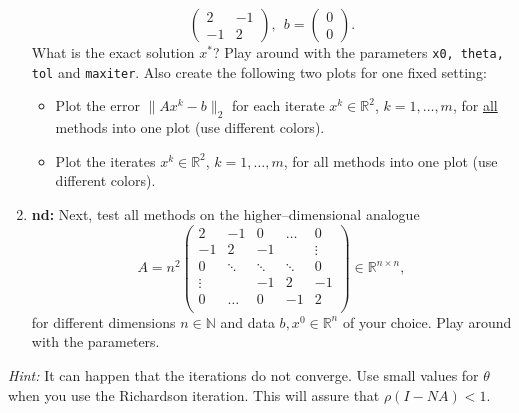 \begin{enumerate}
$$\begin{pmatrix}
		2&-1\\ -1&2
		\end{pmatrix}, ~~b = \begin{pmatrix}
		0\\0
		\end{pmatrix}.$$ 
		What is the exact solution $x^*$? Play around with the parameters \texttt{x0, theta, tol} and \texttt{maxiter}.
		Also create the following two plots for one fixed setting:
		\begin{itemize}
			\item Plot the error $\|Ax^k - b\|_2$  for each iterate $x^k \in \mathbb{R}^2$, $k=1,\dots,m$, for \underline{all} methods into one plot (use different colors).
			\item Plot the iterates $x^k \in \mathbb{R}^2$, $k=1,\dots,m$, for all methods into one plot (use different colors).
		\end{itemize}
		\item \textbf{nd:} Next, test all methods on the higher--dimensional analogue
		$$
		A = n^2 \left(\begin{array}{rrrrr}                                
		2 & -1  &0   & \hdots   & 0 \\                                               
		-1 &  2 & -1  &    &   \vdots \\                                               
		0&  \ddots &  \ddots &\ddots  &0  \\ 
		\vdots  &    &  -1 &  2 & -1  \\ 
		0 &   \hdots  & 0& -1  &  2 \\
		\end{array}\right)\in \mathbb{R}^{n \times n},$$
		for different dimensions $n\in\mathbb{N}$ and data $b,x^0 \in \mathbb{R}^n$ of your choice. Play around with the parameters.
	\end{enumerate}
	\textit{Hint: } It can happen that the iterations do not converge. Use small values for $\theta$ when you use the Richardson iteration. This will assure that $\rho(I-NA)<1$. 
